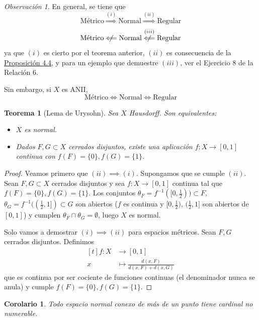 \documentclass[12pt]{report}
\newtheorem{corollary}{Corolario}[chapter]
\newtheorem{theorem}{Teorema}[chapter]
\theoremstyle{definition}
\theoremstyle{definition}
\theoremstyle{remark}
\newtheorem*{obs}{Observación} %
\begin{document}
\begin{obs}
En general, se tiene que
\[\textrm{Métrico} \overset{(i)}{\Longrightarrow} \textrm{Normal} \overset{(ii)}{\Longrightarrow} \textrm{Regular}\]
\[\textrm{Métrico} \centernot\Longleftarrow \textrm{Normal} \overset{(iii)}{\centernot\Longleftarrow} \textrm{Regular}\]
ya que $(i)$ es cierto por el teorema anterior, $(ii)$ es consecuencia de la \hyperref[prop4.4.]{\color{blue}Proposición 4.4}, y para un ejemplo que demuestre $(iii)$, ver el Ejercicio 8 de la Relación 6.

\vspace{2mm}
Sin embargo, si $X$ es ANII,
\[\textrm{Métrico} \iff \textrm{Normal} \iff \textrm{Regular}\]
\end{obs}

\begin{theorem}[Lema de Urysohn]
Sea $X$ Hausdorff. Son equivalentes:
\begin{itemize}
    \item[(i)] $X$ es normal.
    \item[(ii)] Dados $F,G \subset X$ cerrados disjuntos, existe una aplicación $f \colon X \to [0,1]$ continua con $f(F) = \{0\}, f(G) = \{1\}$.
\end{itemize}
\end{theorem}

\begin{proof}
Veamos primero que $(ii) \implies (i)$. Supongamos que se cumple $(ii)$. Sean $F,G \subset X$ cerrados disjuntos y sea $f \colon X \to [0,1]$ continua tal que $f(F) = \{0\}, f(G) = \{1\}$. Los conjuntos $\theta_F = f^{-1}([0,\frac{1}{2})) \subset F$, $\theta_G = f^{-1}((\frac{1}{2},1]) \subset G$ son abiertos ($f$ es continua y $[0,\frac{1}{2})$, $(\frac{1}{2},1]$ son abiertos de $[0,1]$) y cumplen $\theta_F \cap \theta_G = \emptyset$, luego $X$ es normal.

\vspace{2mm}
Solo vamos a demostrar $(i) \implies (ii)$ para espacios métricos. Sean $F,G$ cerrados disjuntos. Definimos
\[
\begin{aligned}[t]
    f \colon X & \longrightarrow [0,1] \\
    x & \longmapsto \frac{d(x,F)}{d(x,F) + d(x,G)}
\end{aligned}
\]
que es continua por ser cociente de funciones continuas (el denominador nunca se anula) y cumple $f(F) = \{0\}, f(G) = \{1\}$.
\end{proof}

\begin{corollary}
Todo espacio normal conexo de más de un punto tiene cardinal no numerable.
\end{corollary}
\end{document}
